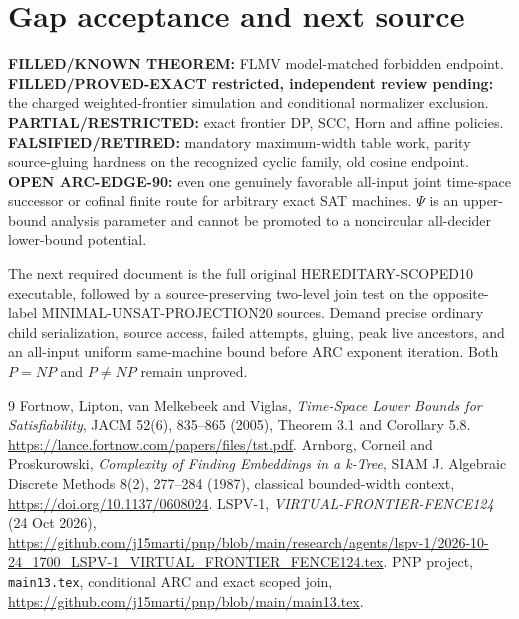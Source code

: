 \documentclass[11pt]{article}
\begin{document}
\section{Gap acceptance and next source}
\noindent\textbf{FILLED/KNOWN THEOREM:} FLMV model-matched forbidden endpoint. \textbf{FILLED/PROVED-EXACT restricted, independent review pending:} the charged weighted-frontier simulation and conditional normalizer exclusion. \textbf{PARTIAL/RESTRICTED:} exact frontier DP, SCC, Horn and affine policies. \textbf{FALSIFIED/RETIRED:} mandatory maximum-width table work, parity source-gluing hardness on the recognized cyclic family, old cosine endpoint. \textbf{OPEN ARC-EDGE-90:} even one genuinely favorable all-input joint time-space successor or cofinal finite route for arbitrary exact SAT machines. \(\Psi\) is an upper-bound analysis parameter and cannot be promoted to a noncircular all-decider lower-bound potential.

The next required document is the full original HEREDITARY-SCOPED10 executable, followed by a source-preserving two-level join test on the opposite-label MINIMAL-UNSAT-PROJECTION20 sources. Demand precise ordinary child serialization, source access, failed attempts, gluing, peak live ancestors, and an all-input uniform same-machine bound before ARC exponent iteration. Both \(P=NP\) and \(P\ne NP\) remain unproved.

\begin{thebibliography}{9}
 Fortnow, Lipton, van Melkebeek and Viglas, \emph{Time-Space Lower Bounds for Satisfiability}, JACM 52(6), 835--865 (2005), Theorem 3.1 and Corollary 5.8. \url{https://lance.fortnow.com/papers/files/tst.pdf}.
 Arnborg, Corneil and Proskurowski, \emph{Complexity of Finding Embeddings in a k-Tree}, SIAM J. Algebraic Discrete Methods 8(2), 277--284 (1987), classical bounded-width context, \url{https://doi.org/10.1137/0608024}.
 LSPV-1, \emph{VIRTUAL-FRONTIER-FENCE124} (24 Oct 2026), \url{https://github.com/j15marti/pnp/blob/main/research/agents/lspv-1/2026-10-24_1700_LSPV-1_VIRTUAL_FRONTIER_FENCE124.tex}.
 PNP project, \texttt{main13.tex}, conditional ARC and exact scoped join, \url{https://github.com/j15marti/pnp/blob/main/main13.tex}.
\end{thebibliography}
\end{document}
